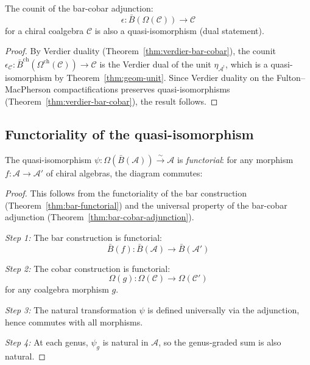\begin{proposition}\label{prop:counit-qi}
The counit of the bar-cobar adjunction:
\[\epsilon: \bar{B}(\Omega(\mathcal{C})) \longrightarrow \mathcal{C}\]
for a chiral coalgebra $\mathcal{C}$ is also a quasi-isomorphism (dual statement).
\end{proposition}

\begin{proof}
By Verdier duality (Theorem~\ref{thm:verdier-bar-cobar}), the counit $\epsilon_{\mathcal{C}} \colon \bar{B}^{\mathrm{ch}}(\Omega^{\mathrm{ch}}(\mathcal{C})) \to \mathcal{C}$ is the Verdier dual of the unit $\eta_{\mathcal{A}^!}$, which is a quasi-isomorphism by Theorem~\ref{thm:geom-unit}.  Since Verdier duality on the Fulton--MacPherson compactifications preserves quasi-isomorphisms (Theorem~\ref{thm:verdier-bar-cobar}), the result follows.
\end{proof}

\subsection{Functoriality of the quasi-isomorphism}

\begin{theorem}\label{thm:bar-cobar-inversion-functorial}
\label{thm:cobar-functorial}
The quasi-isomorphism $\psi: \Omega(\bar{B}(\mathcal{A})) \xrightarrow{\sim} \mathcal{A}$ 
is \emph{functorial}: for any morphism $f: \mathcal{A} \to \mathcal{A}'$ of 
chiral algebras, the diagram commutes:

\begin{center}
\end{center}
\end{theorem}

\begin{proof}
This follows from the functoriality of the bar construction (Theorem~\ref{thm:bar-functorial}) and the universal property of the bar-cobar adjunction (Theorem~\ref{thm:bar-cobar-adjunction}).

\emph{Step 1:} The bar construction is functorial:
\[\bar{B}(f): \bar{B}(\mathcal{A}) \to \bar{B}(\mathcal{A}')\]

\emph{Step 2:} The cobar construction is functorial:
\[\Omega(g): \Omega(\mathcal{C}) \to \Omega(\mathcal{C}')\]
for any coalgebra morphism $g$.

\emph{Step 3:} The natural transformation $\psi$ is defined universally via the 
adjunction, hence commutes with all morphisms.

\emph{Step 4:} At each genus, $\psi_g$ is natural in $\mathcal{A}$, so the 
genus-graded sum is also natural.
\end{proof}

